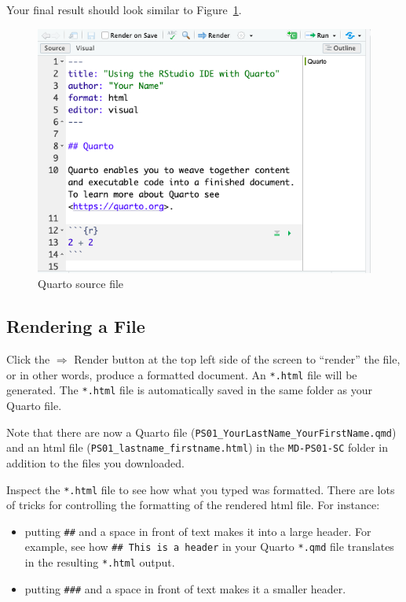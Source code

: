 \documentclass[
  letterpaper,
  DIV=11,
  numbers=noendperiod]{scrartcl}
\providecommand{\tightlist}{%
  \setlength{\itemsep}{0pt}\setlength{\parskip}{0pt}}\usepackage{longtable,booktabs,array}
\begin{document}
Your final result should look similar to Figure~\ref{fig-changes}.

\begin{figure}

{\centering \includegraphics[width=4.57in,height=\textheight]{figures/QUATRO-changes.png}

}

\caption{\label{fig-changes}Quarto source file}

\end{figure}

\hypertarget{rendering-a-file}{%
\subsection{Rendering a File}\label{rendering-a-file}}

Click the \(\Rightarrow\) Render button at the top left side of the
screen to ``render'' the file, or in other words, produce a formatted
document. An \texttt{*.html} file will be generated. The \texttt{*.html}
file is automatically saved in the same folder as your Quarto file.

Note that there are now a Quarto file
(\texttt{PS01\_YourLastName\_YourFirstName.qmd}) and an html file
(\texttt{PS01\_lastname\_firstname.html}) in the \texttt{MD-PS01-SC}
folder in addition to the files you downloaded.

Inspect the \texttt{*.html} file to see how what you typed was
formatted. There are lots of tricks for controlling the formatting of
the rendered html file. For instance:

\begin{itemize}
\tightlist
\item
  putting \texttt{\#\#} and a space in front of text makes it into a
  large header. For example, see how \texttt{\#\#\ This\ is\ a\ header}
  in your Quarto \texttt{*.qmd} file translates in the resulting
  \texttt{*.html} output.
\item
  putting \texttt{\#\#\#} and a space in front of text makes it a
  smaller header.
\end{itemize}
\end{document}
